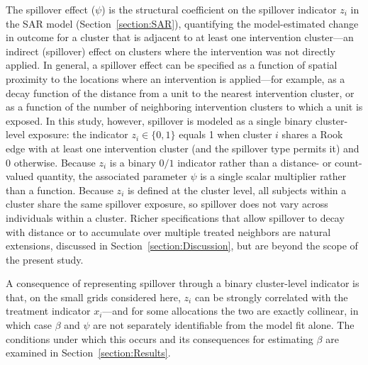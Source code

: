 \documentclass{article}[11pt]
\begin{document}
The spillover effect ($\psi$) is the structural coefficient on the spillover indicator $z_i$ in the SAR model (Section~\ref{section:SAR}), quantifying the model-estimated change in outcome for a cluster that is adjacent to at least one intervention cluster---an indirect (spillover) effect on clusters where the intervention was not directly applied\cite{benjamin-chung_spillover_2017}\cite{benjamin-chung_extension_2024}. In general, a spillover effect can be specified as a function of spatial proximity to the locations where an intervention is applied---for example, as a decay function of the distance from a unit to the nearest intervention cluster, or as a function of the number of neighboring intervention clusters to which a unit is exposed. In this study, however, spillover is modeled as a single binary cluster-level exposure: the indicator $z_i \in \{0,1\}$ equals 1 when cluster $i$ shares a Rook edge with at least one intervention cluster (and the spillover type permits it) and 0 otherwise. Because $z_i$ is a binary $0/1$ indicator rather than a distance- or count-valued quantity, the associated parameter $\psi$ is a single scalar multiplier rather than a function. Because $z_i$ is defined at the cluster level, all subjects within a cluster share the same spillover exposure, so spillover does not vary across individuals within a cluster. Richer specifications that allow spillover to decay with distance or to accumulate over multiple treated neighbors are natural extensions, discussed in Section~\ref{section:Discussion}, but are beyond the scope of the present study.

A consequence of representing spillover through a binary cluster-level indicator is that, on the small grids considered here, $z_i$ can be strongly correlated with the treatment indicator $x_i$---and for some allocations the two are exactly collinear, in which case $\beta$ and $\psi$ are not separately identifiable from the model fit alone. The conditions under which this occurs and its consequences for estimating $\beta$ are examined in Section~\ref{section:Results}.

\end{document}
